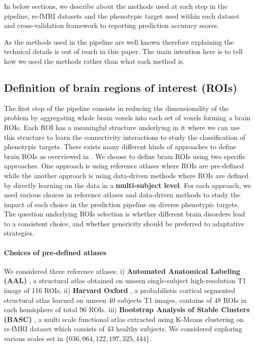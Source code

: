 \documentclass[5p]{elsarticle}
\begin{document}
In below sections, we describe about the methods used at each step
in the pipeline, rs-fMRI datasets and the phenotypic target used
within each dataset and cross-validation framework to reporting
prediction accuracy scores.

As the methods used in the pipeline are well known therefore explaining the
technical details is out of reach in this paper. The main intention here is to
tell how we used the methods rather than what each method is.
\subsection{Definition of brain regions of interest (ROIs)}
The first step of the pipeline consists in reducing the
dimensionality of the problem by aggregating whole brain voxels into
each set of voxels forming a brain ROIs. Each ROI has a meaningful structure
underlying in it where we can use this structure to learn the connectivity
interactions to study the classification of phenotypic targets.
There exists many different kinds of approaches to define brain ROIs
as overviewed in \citep{thirion2014}. We choose to define brain ROIs
using two specific approaches. One approach is using reference atlases
where ROIs are pre-defined while the another approach is
using data-driven methods where ROIs are defined by directly learning
on the data in a \textbf{multi-subject level}. For each approach, we used
various choices in reference atlases and data-driven methods to study the
impact of each choice in the prediction pipeline on diverse phenotypic targets.
The question underlying ROIs selection is whether different brain
disorders lead to a consistent choice, and whether genericity
should be preferred to adaptative strategies.

\paragraph{Choices of pre-defined atlases}
We considered three reference atlases: i) \textbf{Automated Anatomical Labeling
(AAL)} \citep{tzourio-mazoyer2002a}, a structural atlas obtained on
unseen single-subject high-resolution T1 image of 116 ROIs,
ii) \textbf{Harvard Oxford}
\citep{desikan2006}, a probabilistic cortical segmented structural
atlas learned on unseen 40 subjects T1 images, contains of 48 ROIs in
each hemisphere of total 96 ROIs. iii) \textbf{Bootstrap Analysis of
Stable Clusters (BASC)} \citep{bellec2010}, a multi scale functional atlas
extracted using K-Means clustering on rs-fMRI dataset which
consists of 43 healthy subjects. We considered exploring various scales set
in $\{036, 064, 122, 197, 325, 444\}$.
\end{document}
